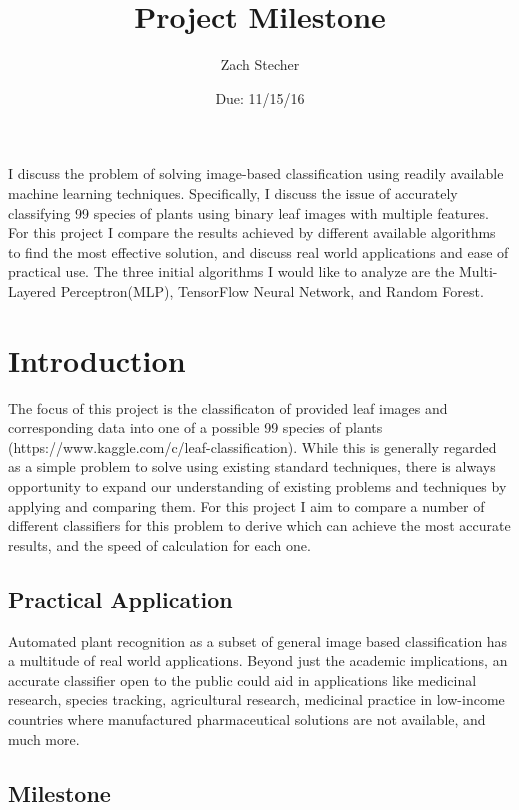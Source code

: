 \documentclass[12pt]{article}
\title{Project Milestone}
\author{Zach Stecher}
\date{Due: 11/15/16}
\begin{document}
\maketitle

\section*{}

I discuss the problem of solving image-based classification using readily available machine learning techniques. Specifically, I discuss the issue of accurately classifying 99 species of plants using binary leaf images with multiple features. For this project I compare the results achieved by different available algorithms to find the most effective solution, and discuss real world applications and ease of practical use. The three initial algorithms I would like to analyze are the Multi-Layered Perceptron(MLP), TensorFlow Neural Network, and Random Forest.

\section{Introduction}

The focus of this project is the classificaton of provided leaf images and corresponding data into one of a possible 99 species of plants (https://www.kaggle.com/c/leaf-classification). While this is generally regarded as a simple problem to solve using existing standard techniques, there is always opportunity to expand our understanding of existing problems and techniques by applying and comparing them. For this project I aim to compare a number of different classifiers for this problem to derive which can achieve the most accurate results, and the speed of calculation for each one.

\subsection{Practical Application}

Automated plant recognition as a subset of general image based classification has a multitude of real world applications. Beyond just the academic implications, an accurate classifier open to the public could aid in applications like medicinal research, species tracking, agricultural research, medicinal practice in low-income countries where manufactured pharmaceutical solutions are not available, and much more.

\subsection{Milestone}
\end{document}
